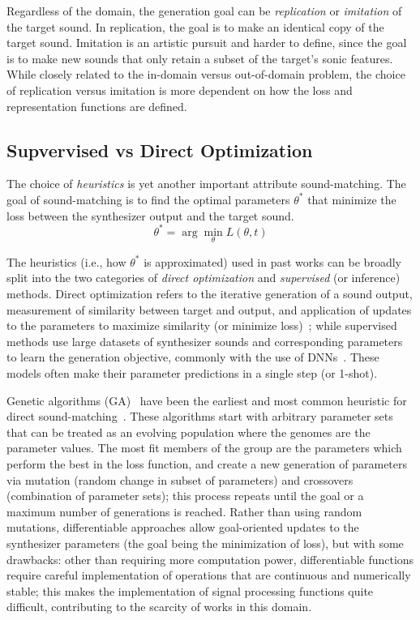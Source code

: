 Regardless of the domain, the generation goal can be \textit{replication} or \textit{imitation} of the target sound. In replication, the goal is to make an identical copy of the target sound. Imitation is an artistic pursuit and harder to define, since the goal is to make new sounds that only retain a subset of the target's sonic features. While closely related to the in-domain versus out-of-domain problem, the choice of replication versus imitation is more dependent on how the loss and representation functions are defined. 

\subsection{Supvervised vs Direct Optimization}
\label{sec:optimization}

The choice of \textit{heuristics} is yet another important attribute sound-matching. The goal of sound-matching is to find the optimal parameters $\theta^*$ that minimize the loss between the synthesizer output and the target sound. 
\[
\theta^* = \arg\min_{\theta} L(\theta,t)
\]

The heuristics (i.e., how $\theta^*$ is approximated) used in past works can be broadly split into the two categories of \textit{direct optimization} and \textit{supervised}  (or inference) methods. Direct optimization refers to the iterative generation of a sound output, measurement of similarity between target and output, and application of updates to the parameters to maximize similarity (or minimize loss)~\cite{horner1993machine,mitchell2007evolutionary,yee2018automatic,vahidi2023mesostructures}; while supervised methods use large datasets of synthesizer sounds and corresponding parameters to learn the generation objective, commonly with the use of DNNs~\cite{engel2020ddsp,salimi2020make,yee2018automatic,esling2019flow}. These models often make their parameter predictions in a single step (or 1-shot). 

Genetic algorithms (\gls{GA})~\cite{holland1992genetic} have been the earliest and most common heuristic for direct sound-matching~\cite{horner1993machine,mitchell2007evolutionary,yee2018automatic}. These algorithms start with arbitrary parameter sets that can be treated as an evolving population where the genomes are the parameter values. The most fit members of the group are the parameters which perform the best in the loss function, and create a new generation of parameters via mutation (random change in subset of parameters) and crossovers (combination of parameter sets); this process repeats until the goal or a maximum number of generations is reached. Rather than using random mutations, differentiable approaches allow goal-oriented updates to the synthesizer parameters (the goal being the minimization of loss), but with some drawbacks: other than requiring more computation power, differentiable functions require careful implementation of operations that are continuous and numerically stable; this makes the implementation of signal processing functions quite difficult, contributing to the scarcity of works in this domain.


